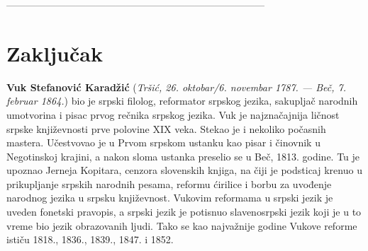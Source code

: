 \documentclass[12pt,oneside]{memoir}
\begin{document}
------------------------------------------------------------------------------



\chapter{Zaključak}


\literatura

\backmatter

\begin{biografija}
  \textbf{Vuk Stefanović Karadžić} (\emph{Tršić,
    26. oktobar/6. novembar 1787. — Beč, 7. februar 1864.}) bio je
  srpski filolog, reformator srpskog jezika, sakupljač narodnih
  umotvorina i pisac prvog rečnika srpskog jezika.  Vuk je
  najznačajnija ličnost srpske književnosti prve polovine XIX
  veka. Stekao je i nekoliko počasnih mastera.  Učestvovao je u
  Prvom srpskom ustanku kao pisar i činovnik u Negotinskoj krajini, a
  nakon sloma ustanka preselio se u Beč, 1813. godine. Tu je upoznao
  Jerneja Kopitara, cenzora slovenskih knjiga, na čiji je podsticaj
  krenuo u prikupljanje srpskih narodnih pesama, reformu ćirilice i
  borbu za uvođenje narodnog jezika u srpsku književnost. Vukovim
  reformama u srpski jezik je uveden fonetski pravopis, a srpski jezik
  je potisnuo slavenosrpski jezik koji je u to vreme bio jezik
  obrazovanih ljudi. Tako se kao najvažnije godine Vukove reforme
  ističu 1818., 1836., 1839., 1847. i 1852.
\end{biografija}
\end{document}
